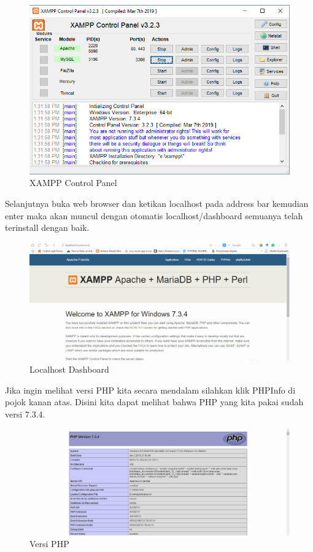 \begin{figure}[h]
\centering
\includegraphics[scale=0.5]{figures/controlpanel}
\caption{XAMPP Control Panel}
\end{figure}

Selanjutnya buka web browser dan ketikan localhost pada address bar kemudian enter maka akan muncul dengan otomatis localhost/dashboard semuanya telah terinstall dengan baik.

\begin{figure}[h]
\centering
\includegraphics[scale=0.3]{figures/dashboard}
\caption{Localhost Dashboard}
\end{figure}

Jika ingin melihat versi PHP kita secara mendalam silahkan klik PHPInfo di pojok kanan atas. Disini kita dapat melihat bahwa PHP yang kita pakai sudah versi 7.3.4.

\begin{figure}[h]
\centering
\includegraphics[scale=0.4]{figures/versiphp}
\caption{Versi PHP}
\end{figure}

